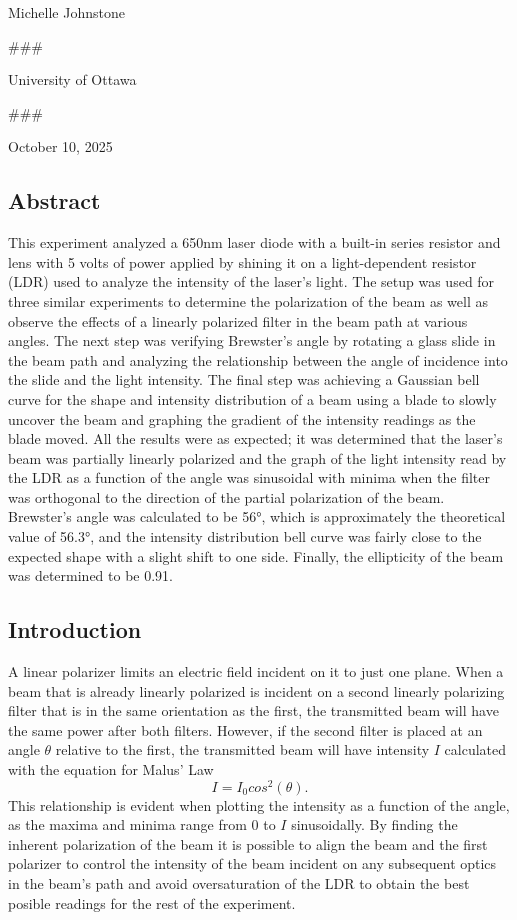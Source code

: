 \documentclass[11pt]{article}
\begin{document}
Michelle Johnstone

    \#\#\#

University of Ottawa

    \#\#\#

October 10, 2025

    \hypertarget{abstract}{%
\subsection{Abstract}\label{abstract}}

    This experiment analyzed a 650nm laser diode with a built-in series
resistor and lens with 5 volts of power applied by shining it on a
light-dependent resistor (LDR) used to analyze the intensity of the
laser's light. The setup was used for three similar experiments to
determine the polarization of the beam as well as observe the effects of
a linearly polarized filter in the beam path at various angles. The next
step was verifying Brewster's angle by rotating a glass slide in the
beam path and analyzing the relationship between the angle of incidence
into the slide and the light intensity. The final step was achieving a
Gaussian bell curve for the shape and intensity distribution of a beam
using a blade to slowly uncover the beam and graphing the gradient of
the intensity readings as the blade moved. All the results were as
expected; it was determined that the laser's beam was partially linearly
polarized and the graph of the light intensity read by the LDR as a
function of the angle was sinusoidal with minima when the filter was
orthogonal to the direction of the partial polarization of the beam.
Brewster's angle was calculated to be 56°, which is approximately the
theoretical value of 56.3°, and the intensity distribution bell curve
was fairly close to the expected shape with a slight shift to one side.
Finally, the ellipticity of the beam was determined to be 0.91.

    \hypertarget{introduction}{%
\subsection{Introduction}\label{introduction}}

    A linear polarizer limits an electric field incident on it to just one
plane. When a beam that is already linearly polarized is incident on a
second linearly polarizing filter that is in the same orientation as the
first, the transmitted beam will have the same power after both filters.
However, if the second filter is placed at an angle \(\theta\) relative
to the first, the transmitted beam will have intensity \(I\) calculated
with the equation for Malus' Law \[I = I_0 cos^2(\theta). \tag{1}\] This
relationship is evident when plotting the intensity as a function of the
angle, as the maxima and minima range from 0 to \(I\) sinusoidally. By
finding the inherent polarization of the beam it is possible to align
the beam and the first polarizer to control the intensity of the beam
incident on any subsequent optics in the beam's path and avoid
oversaturation of the LDR to obtain the best posible readings for the
rest of the experiment.
\end{document}
